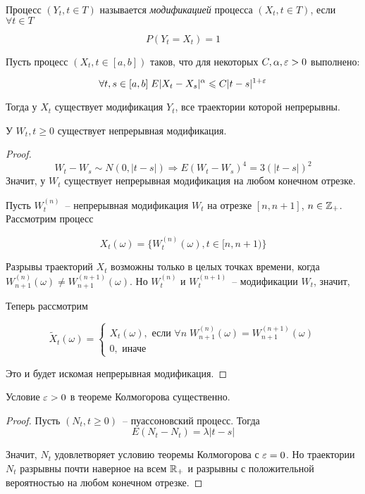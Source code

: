 \begin{definition}
Процесс $(Y_t, t \in T)$ называется \emph{модификацией} процесса $(X_t, t \in T)$, если
$\forall t \in T$

$$P(Y_t = X_t) = 1$$
\end{definition}
\begin{theorem}
Пусть процесс $(X_t, t \in [a,b])$ таков, что для некоторых $C, \alpha, \varepsilon > 0$ выполнено:

$$\forall t, s \in [a,b] \; E|X_t-X_s|^\alpha \leqslant C|t-s|^{1+\varepsilon}$$

Тогда у $X_t$ существует модификация $Y_t$, все траектории которой непрерывны.
\end{theorem}
\begin{corollary}
У $W_t, t \geq 0$ существует непрерывная модификация.
\end{corollary}
\begin{proof}
$$W_t-W_s \sim N(0, |t-s|) \Rightarrow E(W_t-W_s)^4 = 3(|t-s|)^2$$
Значит, у $W_t$ существует непрерывная модификация на любом конечном отрезке.

Пусть $W_t^{(n)}$~-- непрерывная модификация $W_t$ на отрезке $[n, n+1]$, $n \in \mathbb{Z}_+$.
Рассмотрим процесс

$$X_t(\omega) = \{W_t^{(n)}(\omega), t \in [n, n+1)\}$$

Разрывы траекторий $X_t$ возможны только в целых точках времени, когда $W_{n+1}^{(n)}(\omega) \neq
W_{n+1}^{(n+1)}(\omega)$. Но $W_t^{(n)}$ и $W_t^{(n+1)}$~-- модификации $W_t$, значит,


Теперь рассмотрим

$$\tilde X_t(\omega) = \left\lbrace
\begin{array}{l}
X_t(\omega), \text{ если } \forall n \; W_{n+1}^{(n)}(\omega) = W_{n+1}^{(n+1)}(\omega) \\
0, \text{ иначе }
\end{array}
\right.
$$

Это и будет искомая непрерывная модификация.
\end{proof}

\begin{remark}
Условие $\varepsilon > 0$ в теореме Колмогорова существенно.
\end{remark}
\begin{proof}
Пусть $(N_t, t \geq 0)$~-- пуассоновский процесс. Тогда
$$E(N_t-N_t) = \lambda|t-s|$$

Значит, $N_t$ удовлетворяет условию теоремы Колмогорова с $\varepsilon = 0$. Но траектории
$N_t$ разрывны почти наверное на всем $\mathbb{R}_+$ и разрывны с положительной вероятностью на любом конечном отрезке.
\end{proof}


